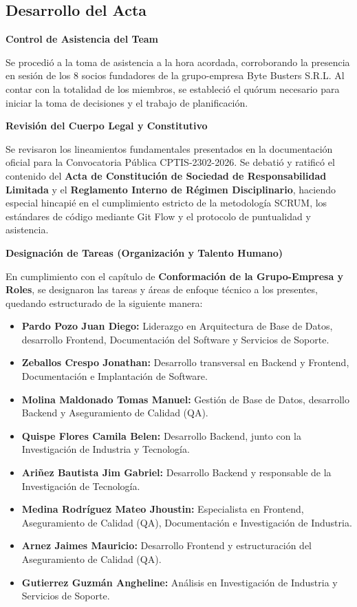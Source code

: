 \newpage
\subsection{Desarrollo del Acta}

\noindent \textbf{Control de Asistencia del Team}\par
Se procedió a la toma de asistencia a la hora acordada, corroborando la presencia en sesión de los 8 socios fundadores de la grupo-empresa Byte Busters S.R.L. Al contar con la totalidad de los miembros, se estableció el quórum necesario para iniciar la toma de decisiones y el trabajo de planificación.

\vspace*{0.5cm}
\noindent \textbf{Revisión del Cuerpo Legal y Constitutivo}\par
Se revisaron los lineamientos fundamentales presentados en la documentación oficial para la Convocatoria Pública CPTIS-2302-2026. Se debatió y ratificó el contenido del \textbf{Acta de Constitución de Sociedad de Responsabilidad Limitada} y el \textbf{Reglamento Interno de Régimen Disciplinario}, haciendo especial hincapié en el cumplimiento estricto de la metodología SCRUM, los estándares de código mediante Git Flow y el protocolo de puntualidad y asistencia.

\vspace*{0.5cm}
\noindent \textbf{Designación de Tareas (Organización y Talento Humano)}\par
En cumplimiento con el capítulo de \textbf{Conformación de la Grupo-Empresa y Roles}, se designaron las tareas y áreas de enfoque técnico a los presentes, quedando estructurado de la siguiente manera:
\begin{itemize}[noitemsep]
    \item \textbf{Pardo Pozo Juan Diego:} Liderazgo en Arquitectura de Base de Datos, desarrollo Frontend, Documentación del Software y Servicios de Soporte.
    \item \textbf{Zeballos Crespo Jonathan:} Desarrollo transversal en Backend y Frontend, Documentación e Implantación de Software.
    \item \textbf{Molina Maldonado Tomas Manuel:} Gestión de Base de Datos, desarrollo Backend y Aseguramiento de Calidad (QA).
    \item \textbf{Quispe Flores Camila Belen:} Desarrollo Backend, junto con la Investigación de Industria y Tecnología.
    \item \textbf{Ariñez Bautista Jim Gabriel:} Desarrollo Backend y responsable de la Investigación de Tecnología.
    \item \textbf{Medina Rodríguez Mateo Jhoustin:} Especialista en Frontend, Aseguramiento de Calidad (QA), Documentación e Investigación de Industria.
    \item \textbf{Arnez Jaimes Mauricio:} Desarrollo Frontend y estructuración del Aseguramiento de Calidad (QA).
    \item \textbf{Gutierrez Guzmán Angheline:} Análisis en Investigación de Industria y Servicios de Soporte.
\end{itemize}

